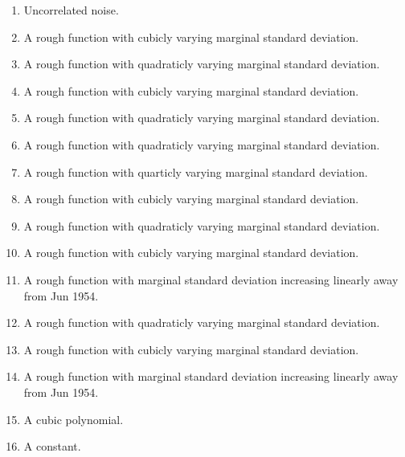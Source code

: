 \documentclass[11pt,a4paper]{article}
\begin{document}
\begin{enumerate}
  \item Uncorrelated noise.
  \item A rough function with cubicly varying marginal standard deviation.
  \item A rough function with quadraticly varying marginal standard deviation.
  \item A rough function with cubicly varying marginal standard deviation.
  \item A rough function with quadraticly varying marginal standard deviation.
  \item A rough function with quadraticly varying marginal standard deviation.
  \item A rough function with quarticly varying marginal standard deviation.
  \item A rough function with cubicly varying marginal standard deviation.
  \item A rough function with quadraticly varying marginal standard deviation.
  \item A rough function with cubicly varying marginal standard deviation.
  \item A rough function with marginal standard deviation increasing linearly away from Jun 1954.
  \item A rough function with quadraticly varying marginal standard deviation.
  \item A rough function with cubicly varying marginal standard deviation.
  \item A rough function with marginal standard deviation increasing linearly away from Jun 1954.
  \item A cubic polynomial.
  \item A constant.
\end{enumerate}
\end{document}
